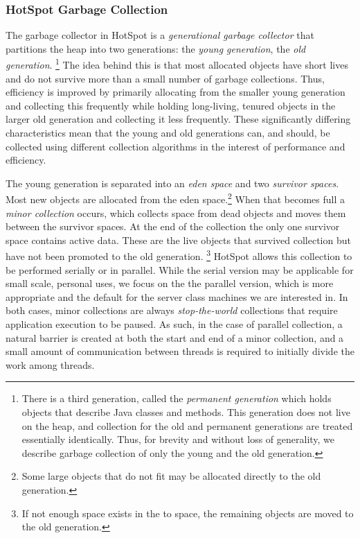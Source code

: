 \documentclass{sig-alternate}
\begin{document}
\subsubsection{HotSpot Garbage Collection}

The garbage collector in HotSpot is a \textit{generational garbage collector}\cite{hotspot:memory} that partitions the heap into two generations: the \textit{young generation}, the \textit{old generation}. \footnote{There is a third generation, called the \textit{permanent generation} which holds objects that describe Java classes and methods. This generation does not live on the heap, and collection for the old and permanent generations are treated essentially identically. Thus, for brevity and without loss of generality, we describe garbage collection of only the young and the old generation.} The idea behind this is that most allocated objects have short lives and do not survive more than a small number of garbage collections. Thus, efficiency is improved by primarily allocating from the smaller young generation and collecting this frequently while holding long-living, tenured objects in the larger old generation and collecting it less frequently. These significantly differing characteristics mean that the young and old generations can, and should, be collected using different collection algorithms in the interest of performance and efficiency.

The young generation is separated into an \textit{eden space} and two \textit{survivor spaces}. Most new objects are allocated from the eden space.\footnote{Some large objects that do not fit may be allocated directly to the old generation.} When that becomes full a \textit{minor collection} occurs, which collects space from dead objects and moves them between the survivor spaces. At the end of the collection the only one survivor space contains active data. These are the live objects that survived collection but have not been promoted to the old generation. \footnote{If not enough space exists in the to space, the remaining objects are moved to the old generation.} HotSpot allows this collection to be performed serially or in parallel. While the serial version may be applicable for small scale, personal uses, we focus on the the parallel version, which is more appropriate and the default for the server class machines we are interested in. In both cases, minor collections are always \textit{stop-the-world} collections that require application execution to be paused. As such, in the case of parallel collection, a natural barrier is created at both the start and end of a minor collection, and a small amount of communication between threads is required to initially divide the work among threads.
\end{document}
